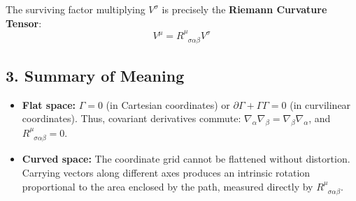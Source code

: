 \documentclass[11pt,a4paper]{article}
\begin{document}
	The surviving factor multiplying $V^\sigma$ is precisely the \textbf{Riemann Curvature Tensor}:
	\begin{equation}
		[\nabla_\alpha, \nabla_\beta] V^\mu = R^\mu_{\phantom{\mu}\sigma \alpha \beta} V^\sigma
	\end{equation}
	
	\subsection{3. Summary of Meaning}
	
	\begin{itemize}
		\item \textbf{Flat space:} $\Gamma = 0$ (in Cartesian coordinates) or $\partial \Gamma + \Gamma \Gamma = 0$ (in curvilinear coordinates). Thus, covariant derivatives commute: $\nabla_\alpha \nabla_\beta = \nabla_\beta \nabla_\alpha$, and $R^\mu_{\phantom{\mu}\sigma \alpha \beta} = 0$.
		\item \textbf{Curved space:} The coordinate grid cannot be flattened without distortion. Carrying vectors along different axes produces an intrinsic rotation proportional to the area enclosed by the path, measured directly by $R^\mu_{\phantom{\mu}\sigma \alpha \beta}$.
	\end{itemize}
	
\end{document}
